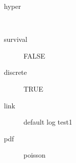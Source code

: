\begin{description}
	\item[hyper]\ 
	 \item[ survival ] FALSE 
	 \item[ discrete ] TRUE 
	 \item[ link ] default log test1 
	 \item[ pdf ] poisson 
\end{description}

